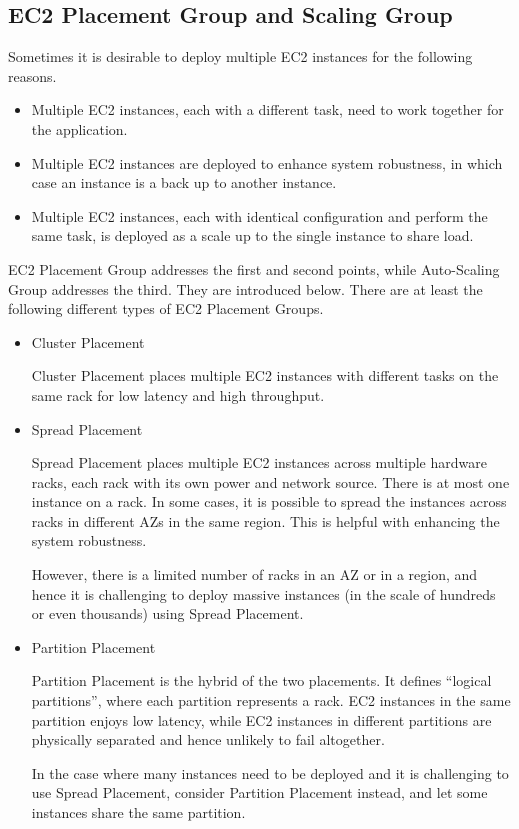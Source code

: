 \subsection{EC2 Placement Group and Scaling Group}

Sometimes it is desirable to deploy multiple EC2 instances for the following reasons.
\begin{itemize}
  \item Multiple EC2 instances, each with a different task, need to work together for the application.
  \item Multiple EC2 instances are deployed to enhance system robustness, in which case an instance is a back up to another instance.
  \item Multiple EC2 instances, each with identical configuration and perform the same task, is deployed as a scale up to the single instance to share load.
\end{itemize}

EC2 Placement Group addresses the first and second points, while Auto-Scaling Group addresses the third. They are introduced below. There are at least the following different types of EC2 Placement Groups.
\begin{itemize}
  \item Cluster Placement
  
  Cluster Placement places multiple EC2 instances with different tasks on the same rack for low latency and high throughput.
  
  \item Spread Placement
  
  Spread Placement places multiple EC2 instances across multiple hardware racks, each rack with its own power and network source. There is at most one instance on a rack. In some cases, it is possible to spread the instances across racks in different AZs in the same region. This is helpful with enhancing the system robustness.
  
  However, there is a limited number of racks in an AZ or in a region, and hence it is challenging to deploy massive instances (in the scale of hundreds or even thousands) using Spread Placement.
  
  \item Partition Placement
  
  Partition Placement is the hybrid of the two placements. It defines ``logical partitions'', where each partition represents a rack. EC2 instances in the same partition enjoys low latency, while EC2 instances in different partitions are physically separated and hence unlikely to fail altogether.
  
  In the case where many instances need to be deployed and it is challenging to use Spread Placement, consider Partition Placement instead, and let some instances share the same partition.
  
\end{itemize}

